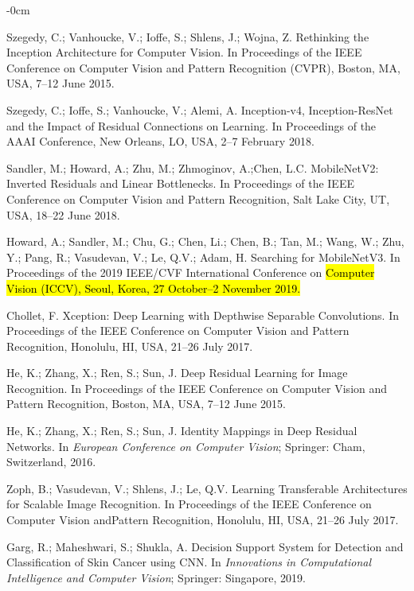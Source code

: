 \documentclass[sensors,article,accept,pdftex,moreauthors]{Definitions/mdpi}
\begin{document}
\begin{adjustwidth}{-\extralength}{0cm}
\begin{thebibliography}{999}
Szegedy, C.; Vanhoucke, V.; Ioffe, S.; Shlens, J.; Wojna, Z.  Rethinking the Inception Architecture for Computer Vision.
In Proceedings of the IEEE Conference on Computer Vision and Pattern {Recognition (CVPR),} Boston, MA, USA, 7--12 June 
{2015}.

Szegedy, C.; Ioffe, S.; Vanhoucke, V.; Alemi, A. Inception-v4, Inception-ResNet and the Impact of Residual Connections on Learning.
{In Proceedings of the AAAI Conference}, New Orleans, LO, USA,
2--7 February {2018}.

Sandler, M.; Howard, A.; Zhu, M.; Zhmoginov, A.;Chen, L.C. MobileNetV2: Inverted Residuals and Linear Bottlenecks.
In Proceedings of the IEEE Conference on Computer Vision and {Pattern Recognition,} Salt Lake City, UT, USA, 18--22 June 
{2018}.

Howard, A.; Sandler, M.; Chu, G.; Chen, Li.; Chen, B.; Tan, M.; Wang, W.; Zhu, Y.; Pang, R.; Vasudevan, V.; Le, Q.V.; Adam, H. Searching for MobileNetV3.
In Proceedings of the 2019 IEEE/CVF International Conference on \hl{Computer Vision (ICCV), Seoul, Korea, 27 October--2 November 2019.}

Chollet, F. Xception: Deep Learning with Depthwise Separable Convolutions.
In Proceedings of the IEEE Conference on Computer Vision and {Pattern Recognition,}  Honolulu, HI, USA, 21--26 July {2017}.

He, K.; Zhang, X.; Ren, S.; Sun, J. Deep Residual Learning for Image Recognition.
In Proceedings of the IEEE Conference on Computer Vision and {Pattern Recognition, } Boston, MA, USA, 7--12 June 
{2015}.

He, K.; Zhang, X.; Ren, S.; Sun, J. Identity Mappings in Deep Residual Networks.
In \emph{European Conference on Computer Vision}; Springer: Cham, Switzerland,
{2016}.

Zoph, B.; Vasudevan, V.; Shlens, J.; Le, Q.V. Learning Transferable Architectures for Scalable Image Recognition. 
In Proceedings of the IEEE Conference on Computer Vision and{Pattern Recognition, }  Honolulu, HI, USA, 21--26 July 
{2017}.

Garg, R.; Maheshwari, S.; Shukla, A. Decision Support System for Detection and Classification of Skin Cancer using CNN. In \emph{Innovations in Computational Intelligence and Computer Vision}; Springer: Singapore, {2019}.


\end{thebibliography}
\end{adjustwidth}
\end{document}
